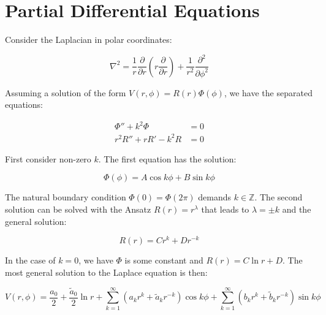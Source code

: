 \documentclass[12pt]{article}
\begin{document}



\pagebreak
\section*{Partial Differential Equations}





Consider the Laplacian in polar coordinates:

\begin{equation}
    \nabla^{2} = \frac{1}{r} \frac{\partial}{\partial r} \left( r \frac{\partial}{\partial r} \right) + \frac{1}{r^{2}} \frac{\partial^{2}}{\partial \phi^{2}}
\end{equation}

Assuming a solution of the form $V(r, \phi) = R(r) \Phi(\phi)$, we have the separated equations:

\begin{equation}
\begin{split}
    \Phi'' + k^{2} \Phi &= 0 \\
    r^{2} R'' + r R' - k^{2} R &= 0
\end{split}
\end{equation}

First consider non-zero $k$. The first equation has the solution:

\begin{equation}
    \Phi(\phi) = A \cos{k \phi} + B \sin{k \phi}
\end{equation}

The natural boundary condition $\Phi(0) = \Phi(2 \pi)$ demands $k \in \mathbb{Z}$. The second solution can be solved with the Ansatz $R(r) = r^{\lambda}$ that leads to $\lambda = \pm k$ and the general solution:

\begin{equation}
    R(r) = C r^{k} + D r^{-k}
\end{equation}

In the case of $k = 0$, we have $\Phi$ is some constant and $R(r) = C \ln{r} + D$. The most general solution to the Laplace equation is then:

\begin{equation}
    V(r, \phi) = \frac{a_{0}}{2} + \frac{\tilde{a}_{0}}{2} \ln{r} + \sum_{k = 1}^{\infty} \left( a_{k} r^{k} + \tilde{a}_{k} r^{-k} \right) \cos{k \phi} + \sum_{k = 1}^{\infty} \left( b_{k} r^{k} + \tilde{b}_{k} r^{-k} \right) \sin{k \phi}
\end{equation}
\end{document}
